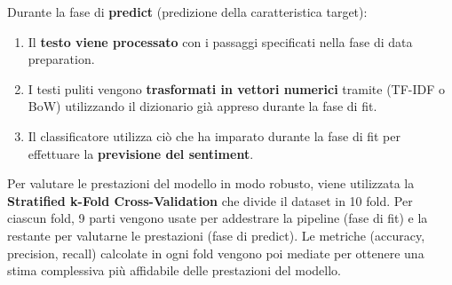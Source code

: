 \documentclass[12pt,a4paper]{report} %
\begin{document}
Durante la fase di\textbf{ predict} (predizione della caratteristica target):
\begin{enumerate}
    \item Il \textbf{testo viene processato} con i passaggi specificati nella fase di data preparation.
    \item I testi puliti vengono \textbf{trasformati in vettori numerici} tramite (TF-IDF o BoW) utilizzando il dizionario già appreso durante la fase di fit. 
    \item Il classificatore utilizza ciò che ha imparato durante la fase di fit per effettuare la \textbf{previsione del sentiment}.
\end{enumerate}
Per valutare le prestazioni del modello in modo robusto, viene utilizzata la  \textbf{Stratified k-Fold Cross-Validation} che divide il dataset in 10 fold. Per ciascun fold, 9 parti vengono usate per addestrare la pipeline (fase di fit) e la restante per valutarne le prestazioni (fase di predict). Le metriche (accuracy, precision, recall) calcolate in ogni fold vengono poi mediate per ottenere una stima complessiva più affidabile delle prestazioni del modello. 
\end{document}
